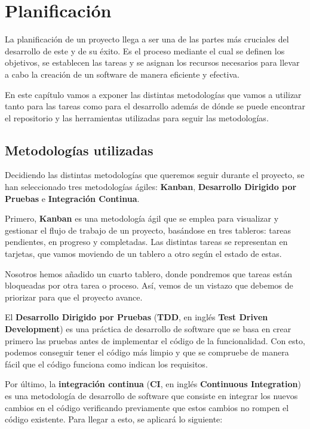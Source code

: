 \chapter{Planificación}

La planificación de un proyecto llega a ser una de las partes más cruciales del 
desarrollo de este y de su éxito. Es el proceso mediante el cual se definen los 
objetivos, se establecen las tareas y se asignan los recursos necesarios para 
llevar a cabo la creación de un software de manera eficiente y efectiva.

En este capítulo vamos a exponer las distintas metodologías que 
vamos a utilizar tanto para las tareas como para el desarrollo además de dónde se 
puede encontrar el repositorio y las herramientas utilizadas para seguir las 
metodologías.

\section{Metodologías utilizadas}

Decidiendo las distintas metodologías que queremos seguir durante el proyecto, se 
han seleccionado tres metodologías ágiles: \textbf{Kanban}, \textbf{Desarrollo 
Dirigido por Pruebas} e \textbf{Integración Continua}.

Primero, \textbf{Kanban} es una metodología ágil que se emplea para visualizar y 
gestionar el flujo de trabajo de un proyecto, basándose en tres tableros: tareas 
pendientes, en progreso y completadas. Las distintas tareas se representan en 
tarjetas, que vamos moviendo de un tablero a otro según el estado de estas.

Nosotros hemos añadido un cuarto tablero, donde pondremos que tareas están 
bloqueadas por otra tarea o proceso. Así, vemos de un vistazo que debemos de 
priorizar para que el proyecto avance.

El \textbf{Desarrollo Dirigido por Pruebas} (\textbf{TDD}, en inglés \textbf{Test 
Driven Development}) es una práctica de desarrollo de software que se basa en crear 
primero las pruebas antes de implementar el código de la funcionalidad. Con esto, 
podemos conseguir tener el código más limpio y que se compruebe de manera fácil que 
el código funciona como indican los requisitos.

Por último, la \textbf{integración continua} (\textbf{CI}, en inglés 
\textbf{Continuous Integration}) es una metodología de desarrollo de software que 
consiste en integrar los nuevos cambios en el código verificando previamente que 
estos cambios no rompen el código existente. Para llegar a esto, se aplicará lo 
siguiente:

